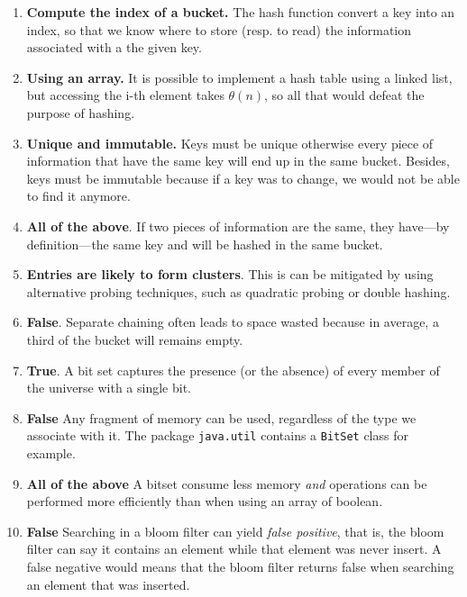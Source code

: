 \documentclass[11pt]{article}
\begin{document}
\begin{enumerate}
\item \textbf{Compute the index of a bucket.} The hash function convert a key
into an index, so that we know where to store (resp. to read) the
information associated with a the given key.

\item \textbf{Using an array.} It is possible to implement a hash table using a linked list,
but accessing the i-th element takes \(\theta(n)\), so all that would
defeat the purpose of hashing.

\item \textbf{Unique and immutable.} Keys must be unique otherwise every piece
of information that have the same key will end up in the same
bucket. Besides, keys must be immutable because if a key was to
change, we would not be able to find it anymore.

\item \textbf{All of the above}. If two pieces of information are the same, they
have---by definition---the same key and will be hashed in the same
bucket.

\item \textbf{Entries are likely to form clusters}. This is can be mitigated by
using alternative probing techniques, such as quadratic probing or
double hashing.

\item \textbf{False}. Separate chaining often leads to space wasted because in
average, a third of the bucket will remains empty.

\item \textbf{True}. A bit set captures the presence (or the absence) of every
member of the universe with a single bit.

\item \textbf{False} Any fragment of memory can be used, regardless of the type we
associate with it. The package \texttt{java.util} contains a \texttt{BitSet}
class for example.

\item \textbf{All of the above} A bitset consume less memory \emph{and} operations
can be performed more efficiently than when using an array of
boolean.

\item \textbf{False} Searching in a bloom filter can yield \emph{false positive}, that
is, the bloom filter can say it contains an element while that
element was never insert. A false negative would means that the
bloom filter returns false when searching an element that was
inserted.
\end{enumerate}
\end{document}
